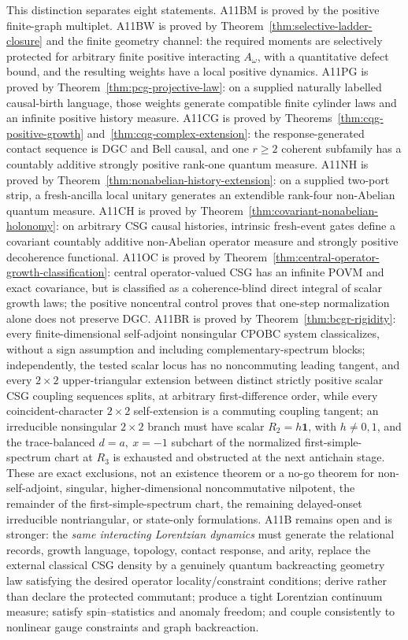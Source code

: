 This distinction separates eight statements.  A11BM is proved by the
positive finite-graph multiplet.  A11BW is proved by
Theorem~\ref{thm:selective-ladder-closure} and the finite geometry channel:
the required moments are selectively protected for arbitrary finite
positive interacting \(A_\omega\), with a quantitative defect bound, and
the resulting weights have a local positive dynamics.  A11PG is proved by
Theorem~\ref{thm:pcg-projective-law}: on a supplied naturally labelled
causal-birth language, those weights generate compatible finite cylinder
laws and an infinite positive history measure.  A11CG is proved by
Theorems~\ref{thm:cqg-positive-growth}
and~\ref{thm:cqg-complex-extension}: the response-generated contact
sequence is DGC and Bell causal, and one \(r\geq2\) coherent subfamily has a
countably additive strongly positive rank-one quantum measure.  A11NH is
proved by Theorem~\ref{thm:nonabelian-history-extension}: on a supplied
two-port strip, a fresh-ancilla local unitary generates an extendible
rank-four non-Abelian quantum measure.  A11CH is proved by
Theorem~\ref{thm:covariant-nonabelian-holonomy}: on arbitrary CSG causal
histories, intrinsic fresh-event gates define a covariant countably
additive non-Abelian operator measure and strongly positive decoherence
functional.  A11OC is proved by
Theorem~\ref{thm:central-operator-growth-classification}: central
operator-valued CSG has an infinite POVM and exact covariance, but is
classified as a coherence-blind direct integral of scalar growth laws; the
positive noncentral control proves that one-step normalization alone does
not preserve DGC.  A11BR is proved by
Theorem~\ref{thm:bcgr-rigidity}: every finite-dimensional self-adjoint
nonsingular CPOBC system classicalizes, without a sign assumption and
including complementary-spectrum blocks; independently, the tested scalar
locus has no noncommuting leading tangent, and every \(2\times2\)
upper-triangular extension between distinct strictly positive scalar CSG
coupling sequences splits, at arbitrary first-difference order, while every
coincident-character \(2\times2\) self-extension is a commuting coupling
tangent; an irreducible nonsingular \(2\times2\) branch must have scalar
\(R_2=h\mathbf1\), with \(h\ne0,1\), and the trace-balanced
\(d=a,\ x=-1\) subchart of the normalized first-simple-spectrum chart at
\(R_3\) is exhausted and obstructed at the next antichain stage.
These are exact exclusions, not an existence theorem or a no-go
theorem for non-self-adjoint, singular, higher-dimensional noncommutative
nilpotent, the remainder of the first-simple-spectrum chart, the remaining
delayed-onset irreducible nontriangular, or state-only formulations.
A11B remains open and is stronger:
the \emph{same interacting Lorentzian
dynamics} must generate the relational records, growth language, topology,
contact response, and arity, replace the external classical CSG density by
a genuinely quantum backreacting geometry law satisfying the desired
operator locality/constraint conditions; derive rather than declare the
protected commutant; produce a
tight Lorentzian continuum measure; satisfy spin--statistics and anomaly
freedom; and couple consistently to nonlinear gauge constraints and graph
backreaction.

